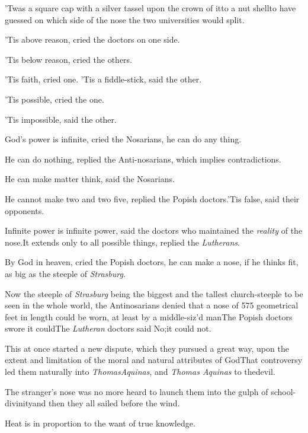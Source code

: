 \documentclass{article}
\begin{document}
’Twas a square cap with a silver tassel upon the crown of
it\tsk to a nut shell\tsk to have guessed on which side of the
nose the two universities would split.

’Tis above reason, cried the doctors on one side.

’Tis below reason, cried the others.

’Tis faith, cried one.
\newpage
’Tis a fiddle-stick, said the other.

’Tis possible, cried the one.

’Tis impossible, said the other.

God’s power is infinite, cried the Nosarians, he can do
any thing.

He can do nothing, replied the Anti-nosarians, which implies
contradictions.

He can make matter think, said the Nosarians.

\noindent
{}

He cannot make two and two five, replied the Popish
doctors.\tsh ’Tis false, said their opponents.\tsk

Infinite power is infinite power, said the doctors who
maintained the \textit{reality}\pb
of the nose.\tsh It extends only to
all possible things, replied the \textit{Lutherans}.

By God in heaven, cried the Popish doctors, he can make a nose,
if he thinks fit, as big as the steeple of \textit{Strasburg}.

Now the steeple of \textit{Strasburg} being the biggest and the
tallest church-steeple to be seen in the whole world, the
Antino\-sarians denied that a nose of 575 geometrical feet in length
could be worn, at least by a middle-siz’d
man\tsk The Popish doctors swore it could\tsk The
\textit{Lutheran} doctors said No;\tsk it could not.

This at once started a new dispute, which they pursued a great
way, upon the extent and limitation of the moral and natural
attributes of God\tsk That controversy led them naturally into
\textit{Thomas}\pb\textit{Aquinas}, and \textit{Thomas
Aquinas} to the\break devil.

The stranger’s nose was no more heard 
to launch them into the gulph of school-divinity\tsk and then they all
sailed before the wind.

Heat is in proportion to the want of true knowledge.
\end{document}
